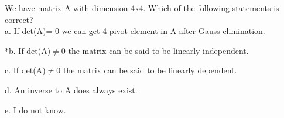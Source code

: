 
We have matrix A with dimension 4x4. Which of the following
statements is correct?\\

a. If det(A)= 0 we can get 4 pivot element in A after Gauss elimination.

*b. If det(A)\(\neq 0\) the matrix can be said to be linearly
independent.

c. If det(A)\(\neq 0\) the matrix can be said to be linearly dependent.

d. An inverse to A does always exist.

e. I do not know.\\
